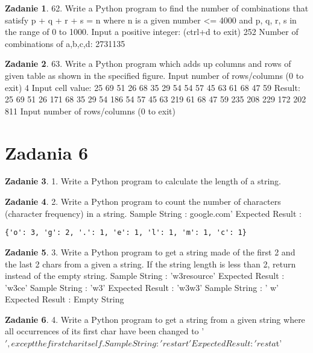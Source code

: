 \documentclass[11pt]{article}
\theoremstyle{definition}
\newtheorem{zadanie}{Zadanie}
\begin{document}
\begin{zadanie}


62. Write a Python program to find the number of combinations that satisfy p + q + r + s = n where n is a given number <= 4000 and p, q, r, s in the range of 0 to 1000. 
Input a positive integer: (ctrl+d to exit)
252
Number of combinations of a,b,c,d: 2731135

\end{zadanie}

\begin{zadanie}


63. Write a Python program which adds up columns and rows of given table as shown in the specified figure. 
Input number of rows/columns (0 to exit)
4
Input cell value:
25 69 51 26
68 35 29 54
54 57 45 63
61 68 47 59
Result:
25 69 51 26 171
68 35 29 54 186
54 57 45 63 219
61 68 47 59 235
208 229 172 202 811
Input number of rows/columns (0 to exit)

\end{zadanie}

\section{Zadania 6}
\begin{zadanie}
1. Write a Python program to calculate the length of a string. 

\end{zadanie}

\begin{zadanie}


2. Write a Python program to count the number of characters (character frequency) in a string. 
Sample String : google.com'
Expected Result : 
\begin{verbatim}
{'o': 3, 'g': 2, '.': 1, 'e': 1, 'l': 1, 'm': 1, 'c': 1}
\end{verbatim}
\end{zadanie}

\begin{zadanie}


3. Write a Python program to get a string made of the first 2 and the last 2 chars from a given a string. If the string length is less than 2, return instead of the empty string. 
Sample String : 'w3resource'
Expected Result : 'w3ce'
Sample String : 'w3'
Expected Result : 'w3w3'
Sample String : ' w'
Expected Result : Empty String

\end{zadanie}

\begin{zadanie}


4. Write a Python program to get a string from a given string where all occurrences of its first char have been changed to '$', except the first char itself. 
Sample String : 'restart'
Expected Result : 'resta$t'

\end{zadanie}
\end{document}
